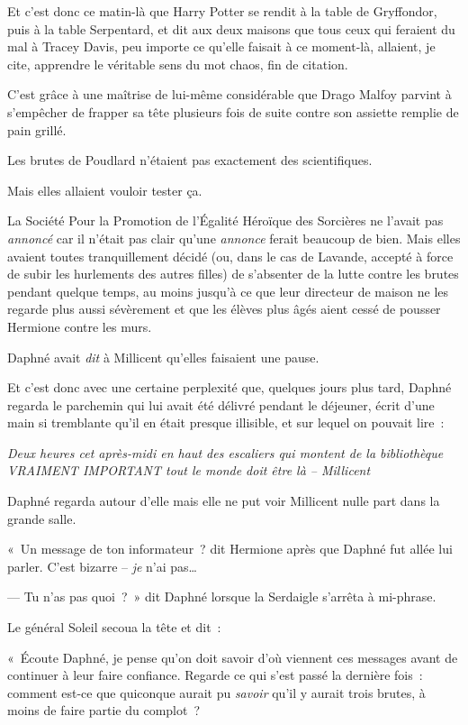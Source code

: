 \later

Et c'est donc ce matin-là que Harry Potter se rendit à la table de Gryffondor, puis à la table Serpentard, et dit aux deux maisons que tous ceux qui feraient du mal à Tracey Davis, peu importe ce qu'elle faisait à ce moment-là, allaient, je cite, apprendre le véritable sens du mot chaos, fin de citation.

C'est grâce à une maîtrise de lui-même considérable que Drago Malfoy parvint à s'empêcher de frapper sa tête plusieurs fois de suite contre son assiette remplie de pain grillé.

Les brutes de Poudlard n'étaient pas exactement des scientifiques.

Mais elles allaient vouloir tester ça.

\later

La Société Pour la Promotion de l'Égalité Héroïque des Sorcières ne l'avait pas \emph{annoncé} car il n'était pas clair qu'une \emph{annonce} ferait beaucoup de bien. Mais elles avaient toutes tranquillement décidé (ou, dans le cas de Lavande, accepté à force de subir les hurlements des autres filles) de s'absenter de la lutte contre les brutes pendant quelque temps, au moins jusqu'à ce que leur directeur de maison ne les regarde plus aussi sévèrement et que les élèves plus âgés aient cessé de pousser Hermione contre les murs.

Daphné avait \emph{dit} à Millicent qu'elles faisaient une pause.

Et c'est donc avec une certaine perplexité que, quelques jours plus tard, Daphné regarda le parchemin qui lui avait été délivré pendant le déjeuner, écrit d'une main si tremblante qu'il en était presque illisible, et sur lequel on pouvait lire~:

\emph{Deux heures cet après-midi en haut des escaliers qui montent de la bibliothèque VRAIMENT IMPORTANT tout le monde doit être là -- Millicent}

Daphné regarda autour d'elle mais elle ne put voir Millicent nulle part dans la grande salle.

«~Un message de ton informateur~? dit Hermione après que Daphné fut allée lui parler. C'est bizarre -- \emph{je} n'ai pas…

--- Tu n'as pas quoi~?~» dit Daphné lorsque la Serdaigle s'arrêta à mi-phrase.

Le général Soleil secoua la tête et dit~:

«~Écoute Daphné, je pense qu'on doit savoir d'où viennent ces messages avant de continuer à leur faire confiance. Regarde ce qui s'est passé la dernière fois~: comment est-ce que quiconque aurait pu \emph{savoir} qu'il y aurait trois brutes, à moins de faire partie du complot~?

